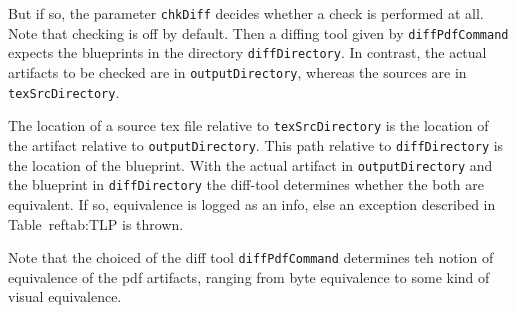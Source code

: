 But if so, the parameter \texttt{chkDiff} 
decides whether a check is performed at all. 
Note that checking is off by default. 
Then a diffing tool given by \texttt{diffPdfCommand} 
expects the blueprints in the directory \texttt{diffDirectory}. 
In contrast, the actual artifacts to be checked are in \texttt{outputDirectory}, 
whereas the sources are in \texttt{texSrcDirectory}. 

The location of a source tex file relative to \texttt{texSrcDirectory} 
is the location of the artifact relative to \texttt{outputDirectory}. 
This path relative to \texttt{diffDirectory} is the location of the blueprint. 
With the actual artifact in \texttt{outputDirectory} 
and the blueprint in \texttt{diffDirectory} 
the diff-tool determines whether the both are equivalent. 
If so, equivalence is logged as an info, 
else an exception described in Table~ref{tab:TLP} is thrown. 

Note that the choiced of the diff tool \texttt{diffPdfCommand} 
determines teh notion of equivalence of the pdf artifacts, 
ranging from byte equivalence to some kind of visual equivalence. 


